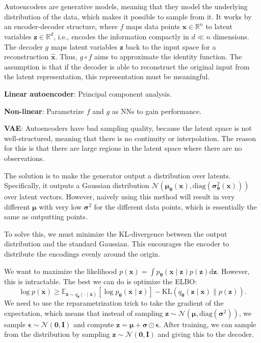 \documentclass{article}
\newcommand{\E}{\mathbb{E}}
\newcommand{\R}{\mathbb{R}}
\renewcommand{\vec}[1]{\bm{#1}}
\newcommand{\mat}[1]{\bm{#1}}
\newenvironment{topic}[1]
{\textbf{\sffamily \colorbox{black}{\rlap{\textbf{\textcolor{white}{#1}}}\hspace{\linewidth}\hspace{-2\fboxsep}}} \\ \vspace{0.2cm}}
{}
\begin{document}
\begin{multicols*}{2}
\begin{topic}{Recurrent neural networks}
    \end{topic}

    \begin{topic}{Autoencoders}

        Autoencoders are generative models, meaning that they model the underlying distribution of the
        data, which makes it possible to sample from it. It works by an encoder-decoder structure, where
        $f$ maps data points $\vec{x} \in \R^n$ to latent variables $\vec{z} \in \R^d$, i.e., encodes the
        information compactly in $d \ll n$ dimensions. The decoder $g$ maps latent variables $\vec{z}$ back
        to the input space for a reconstruction $\hat{\vec{x}}$. Thus, $g \circ f$ aims to approximate the
        identity function. The assumption is that if the decoder is able to reconstruct the original input
        from the latent representation, this representation must be meaningful.

        \textbf{Linear autoencoder}: Principal component analysis.

        \textbf{Non-linear}: Parametrize $f$ and $g$ as NNs to gain performance.

        \textbf{VAE}: Autoencoders have bad sampling quality, because the latent space is not
        well-structured, meaning that there is no continuity or interpolation. The reason for this is
        that there are large regions in the latent space where there are no observations.

        The solution is to make the generator output a distribution over latents. Specifically, it outputs
        a Gaussian distribution $\mathcal{N}(\vec{\mu}_{\vec{\theta}}(\vec{x}),
            \mathrm{diag}(\vec{\sigma}_{\vec{\theta}}^2(\vec{x})))$ over latent vectors. However, naively using
        this method will result in very different $\vec{\mu}$ with very low $\vec{\sigma}^2$ for the
        different data points, which is essentially the same as outputting points.

        To solve this, we must minimize the KL-divergence between the output distribution and the standard
        Gaussian. This encourages the encoder to distribute the encodings evenly around the origin.

        We want to maximize the likelihood $p(\vec{x}) = \int p_{\vec{\theta}}(\vec{x} \mid \vec{z})
            p(\vec{z}) \mathrm{d}\vec{z}$. However, this is intractable. The best we can do is optimize the
        ELBO: \[
            \log p(\vec{x}) \geq \E_{\vec{z} \sim q_{\vec{\theta}}(\cdot \mid \vec{x})} [\log p_{\vec{\theta}}(\vec{x} \mid \vec{z})] - \mathrm{KL}(q_{\vec{\theta}}(\vec{z} \mid \vec{x}) \lVert p(\vec{z})).
        \]
        We need to use the reparametrization trick to take the gradient of the expectation, which means
        that instead of sampling $\vec{z} \sim \mathcal{N}(\vec{\mu}, \mathrm{diag}(\vec{\sigma}^2))$, we
        sample $\vec{\epsilon} \sim \mathcal{N}(\vec{0}, \mat{I})$ and compute $\vec{z} = \vec{\mu} +
            \vec{\sigma} \odot \vec{\epsilon}$. After training, we can sample from the distribution by sampling
        $\vec{z} \sim \mathcal{N}(\vec{0}, \mat{I})$ and giving this to the decoder.


\end{topic}
\end{multicols*}
\end{document}
